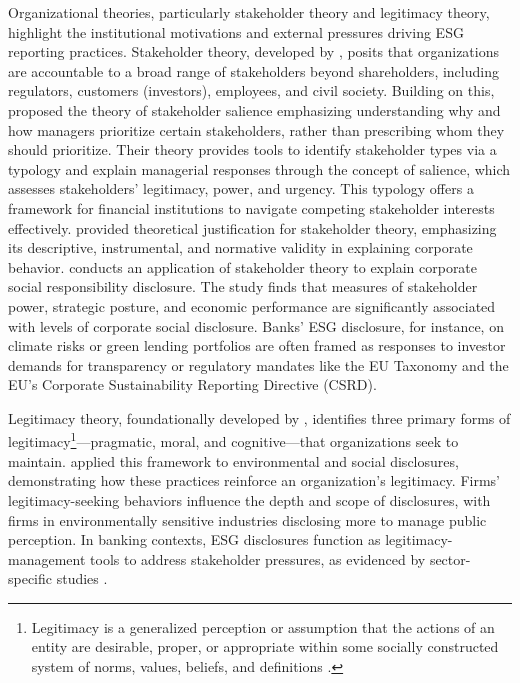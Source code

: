\documentclass[
  authoryear]{elsarticle}
\begin{document}
Organizational theories, particularly stakeholder theory and legitimacy
theory, highlight the institutional motivations and external pressures
driving ESG reporting practices. Stakeholder theory, developed by
\citet{FREEMAN1984}, posits that organizations are accountable to a
broad range of stakeholders beyond shareholders, including regulators,
customers (investors), employees, and civil society. Building on this,
\citet{MITCHELL1997} proposed the theory of stakeholder salience
emphasizing understanding why and how managers prioritize certain
stakeholders, rather than prescribing whom they should prioritize. Their
theory provides tools to identify stakeholder types via a typology and
explain managerial responses through the concept of salience, which
assesses stakeholders' legitimacy, power, and urgency. This typology
offers a framework for financial institutions to navigate competing
stakeholder interests effectively. \citet{DONALDSON1995} provided
theoretical justification for stakeholder theory, emphasizing its
descriptive, instrumental, and normative validity in explaining
corporate behavior. \citet{ROBERTS1992} conducts an application of
stakeholder theory to explain corporate social responsibility
disclosure. The study finds that measures of stakeholder power,
strategic posture, and economic performance are significantly associated
with levels of corporate social disclosure. Banks' ESG disclosure, for
instance, on climate risks or green lending portfolios are often framed
as responses to investor demands for transparency or regulatory mandates
like the EU Taxonomy and the EU's Corporate Sustainability Reporting
Directive (CSRD).

Legitimacy theory, foundationally developed by \citet{SUCHMAN1995},
identifies three primary forms of legitimacy\footnote{Legitimacy is a
  generalized perception or assumption that the actions of an entity are
  desirable, proper, or appropriate within some socially constructed
  system of norms, values, beliefs, and definitions
  \citep{GINZEL2004, NEILSEN1987, PERROW1970}.}---pragmatic, moral, and
cognitive---that organizations seek to maintain. \citet{DEEGAN2002}
applied this framework to environmental and social disclosures,
demonstrating how these practices reinforce an organization's
legitimacy. Firms' legitimacy-seeking behaviors influence the depth and
scope of disclosures, with firms in environmentally sensitive industries
disclosing more to manage public perception. In banking contexts, ESG
disclosures function as legitimacy-management tools to address
stakeholder pressures, as evidenced by sector-specific studies
\citep[see][]{THOMPSON2004, MURE2021, CARNEVALE2014}.
\end{document}
